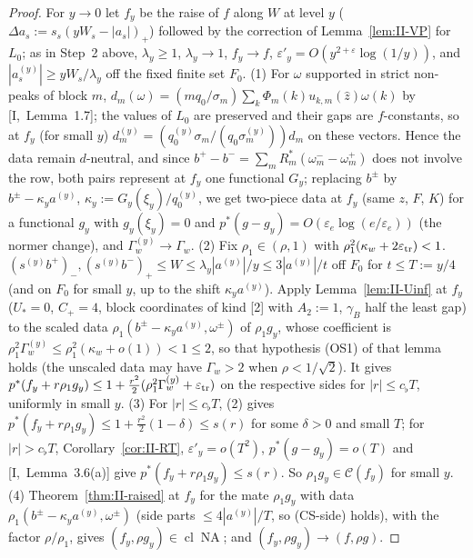 \documentclass[10pt]{amsart}
\theoremstyle{definition}
\theoremstyle{remark}
\newcommand{\NA}{\operatorname{NA}}
\newcommand{\Cset}{\mathcal C}
\newcommand{\cl}{\operatorname{cl}}
\newcommand{\zh}{\hat z}
\begin{document}
\begin{proof}
For $y\to0$ let $f_y$ be the raise of $f$ along $W$ at level $y$
($\Delta a_s:=s_s(yW_s-|a_s|)_+$) followed by the correction of
Lemma~\ref{lem:II-VP} for $L_0$; as in Step~2 above, $\lambda_y\ge1$,
$\lambda_y\to1$, $f_y\to f$, $\varepsilon'_y=O(y^{2+\varepsilon}\log(1/y))$,
and $|a^{(y)}_s|\ge yW_s/\lambda_y$ off the fixed finite set $F_0$.
(1) For $\omega$ supported in strict non-peaks of block $m$,
$d_m(\omega)=(mq_0/\sigma_m)\sum_k\Phi_m(k)u_{k,m}(\zh)\omega(k)$ by
[I,~Lemma~1.7]; the values of $L_0$ are preserved and their gaps are
$f$-constants, so at $f_y$ (for small $y$) $d^{(y)}_m=(q^{(y)}_0\sigma_m/(q_0
\sigma^{(y)}_m))d_m$ on these vectors.  Hence the data remain $d$-neutral, and
since $b^+-b^-=\sum_mR_m^*(\omega^-_m-\omega^+_m)$ does not involve the row,
both pairs represent at $f_y$ one functional $G_y$; replacing $b^\pm$ by
$b^\pm-\kappa_ya^{(y)}$, $\kappa_y:=G_y(\xi_y)/q^{(y)}_0$, we get two-piece data
at $f_y$ (same $z$, $F$, $K$) for a functional $g_y$ with $g_y(\xi_y)=0$ and
$p^*(g-g_y)=O(\varepsilon_e\log(e/\varepsilon_e))$ (the normer change), and
$\Gamma^{(y)}_w\to\Gamma_w$.
(2) Fix $\rho_1\in(\rho,1)$ with $\rho_1^2(\kappa_w+2\varepsilon_{\rm tr})<1$.
$(s^{(y)}b^+)_-,(s^{(y)}b^-)_+\le W\le\lambda_y|a^{(y)}|/y\le3|a^{(y)}|/t$ off
$F_0$ for $t\le T:=y/4$ (and on $F_0$ for small $y$, up to the shift
$\kappa_ya^{(y)}$).  Apply Lemma~\ref{lem:II-Uinf} at $f_y$ ($U_*=0$, $C_+=4$,
block coordinates of kind [2] with $A_2:=1$, $\gamma_B$ half the least gap)
to the scaled data $\rho_1(b^\pm-\kappa_ya^{(y)},\omega^\pm)$ of $\rho_1g_y$,
whose coefficient is $\rho_1^2\Gamma^{(y)}_w\le\rho_1^2(\kappa_w+o(1))<1\le2$,
so that hypothesis (OS1) of that lemma holds (the unscaled data may have
$\Gamma_w>2$ when $\rho<1/\sqrt2$).  It gives $p^*(f_y+r\rho_1g_y)\le1+\frac{r^2}2
(\rho_1^2\Gamma^{(y)}_w+\varepsilon_{\rm tr})$ on the respective sides for
$|r|\le c_\flat T$, uniformly in small $y$.
(3) For $|r|\le c_\flat T$, (2) gives $p^*(f_y+r\rho_1g_y)\le1+\frac{r^2}2
(1-\delta)\le s(r)$ for some $\delta>0$ and small $T$; for $|r|>
c_\flat T$, Corollary~\ref{cor:II-RT}, $\varepsilon'_y=o(T^2)$,
$p^*(g-g_y)=o(T)$ and [I,~Lemma~3.6(a)] give $p^*(f_y+r\rho_1g_y)\le s(r)$.
So $\rho_1g_y\in\Cset(f_y)$ for small $y$.
(4) Theorem~\ref{thm:II-raised} at $f_y$ for the mate $\rho_1g_y$ with data
$\rho_1(b^\pm-\kappa_ya^{(y)},\omega^\pm)$ (side parts $\le4|a^{(y)}|/T$, so
(CS-side) holds), with the factor $\rho/\rho_1$, gives $(f_y,\rho g_y)\in
\cl\NA$; and $(f_y,\rho g_y)\to(f,\rho g)$.
\end{proof}
\end{document}
